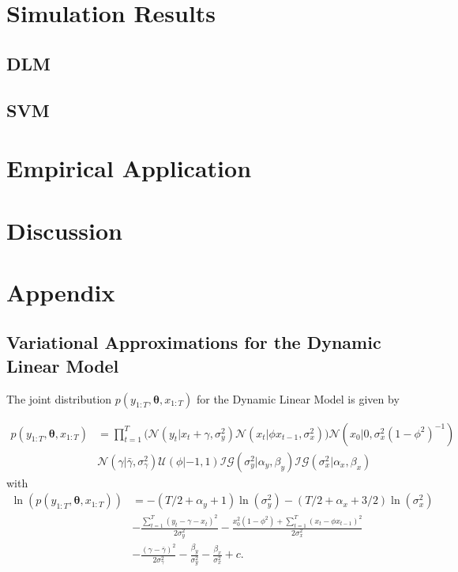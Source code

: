 \documentclass[12pt,a4paper]{article}%
\numberwithin{equation}{section}
\begin{document}
\section{Simulation Results}
\subsection{DLM}
\subsection{SVM}

\section{Empirical Application}

\section{Discussion}


\newpage
\section{Appendix}
\iffalse

\subsection{Variational Approximations for the Dynamic Linear Model}

The joint distribution $p(y_{1:T}, \boldsymbol{\theta}, x_{1:T})$ for the Dynamic Linear Model is given by

\begin{align}
p(y_{1:T}, \boldsymbol{\theta}, x_{1:T}) &= \prod_{t=1}^{T} \bigg( \mathcal{N}(y_t | x_t + \gamma, \sigma^2_y) \mathcal{N}(x_t | \phi x_{t-1}, \sigma^2_x) \bigg) \mathcal{N}(x_0 | 0, \sigma^2_x (1 - \phi^2)^{-1}) \nonumber \\
&\mathcal{N}(\gamma | \bar{\gamma}, \sigma^2_{\gamma}) \mathcal{U}(\phi | -1, 1) \mathcal{IG}(\sigma^2_y | \alpha_y, \beta_y)\mathcal{IG}(\sigma^2_x | \alpha_x, \beta_x) 
\end{align}
with 
\begin{align}
\ln(p(y_{1:T}, \boldsymbol{\theta}, x_{1:T})) &= -(T/2 + \alpha_y + 1) \ln(\sigma_y^2) -(T/2 + \alpha_x + 3/2) \ln(\sigma_x^2) \nonumber \\
&- \frac{\sum_{t=1}^{T}(y_t - \gamma - x_t)^2}{2 \sigma^2_y} - \frac{x_0^2(1 -\phi^2) + \sum_{t=1}^{T}(x_t - \phi x_{t-1})^2}{2 \sigma^2_x} \nonumber \\
&- \frac{(\gamma - \bar{\gamma})^2}{2 \sigma^2_{\gamma}} - \frac{\beta_y}{\sigma^2_y} - \frac{\beta_x}{\sigma^2_x} + c \label{logjoint}. 
\end{align}
\end{document}
